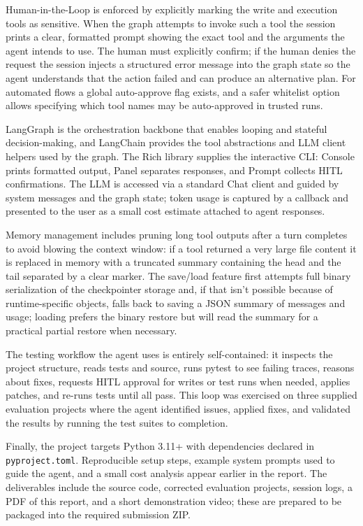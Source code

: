 \documentclass[12pt, a4paper]{article}
\begin{document}
Human-in-the-Loop is enforced by explicitly marking the write and execution tools as sensitive. When the graph attempts to invoke such a tool the session prints a clear, formatted prompt showing the exact tool and the arguments the agent intends to use. The human must explicitly confirm; if the human denies the request the session injects a structured error message into the graph state so the agent understands that the action failed and can produce an alternative plan. For automated flows a global auto-approve flag exists, and a safer whitelist option allows specifying which tool names may be auto-approved in trusted runs.

LangGraph is the orchestration backbone that enables looping and stateful decision-making, and LangChain provides the tool abstractions and LLM client helpers used by the graph. The Rich library supplies the interactive CLI: Console prints formatted output, Panel separates responses, and Prompt collects HITL confirmations. The LLM is accessed via a standard Chat client and guided by system messages and the graph state; token usage is captured by a callback and presented to the user as a small cost estimate attached to agent responses.

Memory management includes pruning long tool outputs after a turn completes to avoid blowing the context window: if a tool returned a very large file content it is replaced in memory with a truncated summary containing the head and the tail separated by a clear marker. The save/load feature first attempts full binary serialization of the checkpointer storage and, if that isn't possible because of runtime-specific objects, falls back to saving a JSON summary of messages and usage; loading prefers the binary restore but will read the summary for a practical partial restore when necessary.

The testing workflow the agent uses is entirely self-contained: it inspects the project structure, reads tests and source, runs pytest to see failing traces, reasons about fixes, requests HITL approval for writes or test runs when needed, applies patches, and re-runs tests until all pass. This loop was exercised on three supplied evaluation projects where the agent identified issues, applied fixes, and validated the results by running the test suites to completion.

Finally, the project targets Python 3.11+ with dependencies declared in \texttt{pyproject.toml}. Reproducible setup steps, example system prompts used to guide the agent, and a small cost analysis appear earlier in the report. The deliverables include the source code, corrected evaluation projects, session logs, a PDF of this report, and a short demonstration video; these are prepared to be packaged into the required submission ZIP.
\end{document}
